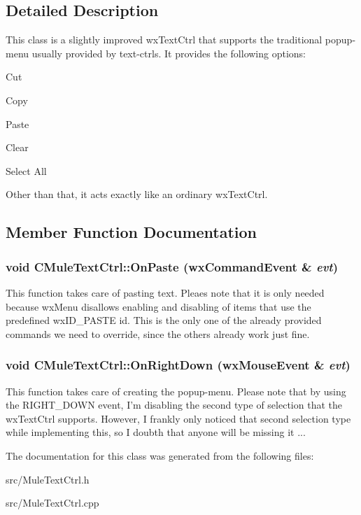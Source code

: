 \subsection{Detailed Description}
This class is a slightly improved wxTextCtrl that supports the traditional popup-\/menu usually provided by text-\/ctrls. It provides the following options:
\begin{DoxyItemize}
\item Cut
\item Copy
\item Paste
\item Clear
\item Select All
\end{DoxyItemize}

Other than that, it acts exactly like an ordinary wxTextCtrl. 

\subsection{Member Function Documentation}
\subsubsection[{OnPaste}]{\setlength{\rightskip}{0pt plus 5cm}void CMuleTextCtrl::OnPaste (wxCommandEvent \& {\em evt})\hspace{0.3cm}{\ttfamily  [protected]}}\label{classCMuleTextCtrl_a4d1c2dc549b9c46584668bd4cc931427}


This function takes care of pasting text. Pleaes note that it is only needed because wxMenu disallows enabling and disabling of items that use the predefined wxID\_\-PASTE id. This is the only one of the already provided commands we need to override, since the others already work just fine. 
\subsubsection[{OnRightDown}]{\setlength{\rightskip}{0pt plus 5cm}void CMuleTextCtrl::OnRightDown (wxMouseEvent \& {\em evt})\hspace{0.3cm}{\ttfamily  [protected]}}\label{classCMuleTextCtrl_adce8d5931ba699e4ae24349c607f4709}


This function takes care of creating the popup-\/menu. Please note that by using the RIGHT\_\-DOWN event, I'm disabling the second type of selection that the wxTextCtrl supports. However, I frankly only noticed that second selection type while implementing this, so I doubth that anyone will be missing it ... 

The documentation for this class was generated from the following files:\begin{DoxyCompactItemize}
\item 
src/MuleTextCtrl.h\item 
src/MuleTextCtrl.cpp\end{DoxyCompactItemize}
